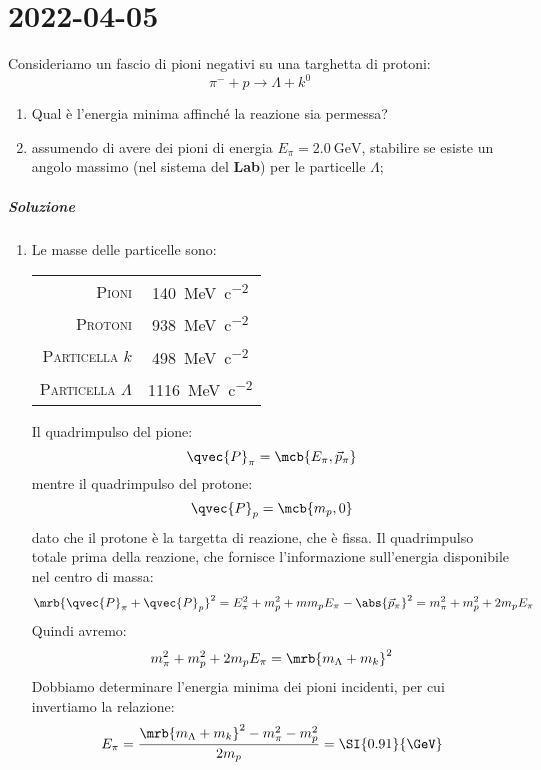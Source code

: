 \chapter{2022-04-05}
\begin{example}[]
  Consideriamo un fascio di pioni negativi su una targhetta di protoni:
  \[
    \pi ^{-} + p \rightarrow \Lambda + k^0
  \]
  \begin{enumerate}
    \item Qual è l'energia minima affinché la reazione sia permessa?
    \item assumendo di avere dei pioni di energia $E _{\pi} = \SI{2.0}{\GeV}$,
      stabilire se esiste un angolo massimo (nel sistema del \textbf{Lab}) per
      le particelle $\Lambda$;
  \end{enumerate}

  \paragraph{Soluzione}
  \begin{enumerate}
    \item Le masse delle particelle sono:
      \begin{table}[h!]
        \centering
        \begin{tabular}{r|c}
          \textsc{Pioni} & \SI{140}{\MeV \per c^2}
          \\
          \textsc{Protoni} & \SI{938}{\MeV \per c^2}
          \\
          \textsc{Particella $k$} & \SI{498}{\MeV \per c^2}
          \\
          \textsc{Particella $\Lambda$} & \SI{1116}{\MeV \per c^2}
        \end{tabular}
      \end{table}
      Il quadrimpulso del pione:
      \[
        \qvec{P} _{\pi} = \mcb{E _{\pi}, \vec{p}_{\pi}}
      \]
      mentre il quadrimpulso del protone:
      \[
        \qvec{P}_{p} = \mcb{m _{p}, 0}
      \]
      dato che il protone è la targetta di reazione, che è fissa.
      Il quadrimpulso totale prima della reazione, che fornisce l'informazione
      sull'energia disponibile nel centro di massa:
      \[
        \mrb{\qvec{P}_{\pi} + \qvec{P}_{p}}^{2} = E _{\pi}^{2} + m _{p}^{2} + m
        m_p E _{\pi} - \abs{\vec{p}_{\pi}}^{2} = m _{\pi}^{2} + m _{p}^{2} + 2
        m_p E _{\pi}
      \]
      Quindi avremo:
      \[
        m _{\pi}^{2} + m _{p}^{2} + 2 m_p E _{\pi} = \mrb{m _{\Lambda} + m
        _{k}}^{2}
      \]
      Dobbiamo determinare l'energia minima dei pioni incidenti, per cui
      invertiamo la relazione:
      \[
        E _{\pi} = \frac{\mrb{m _{\Lambda} + m _{k}}^{2} - m _{\pi}^{2} - m
        _{p}^{2}}{2 m_p} = \SI{0.91}{\GeV}
      \]


\end{enumerate}
\end{example}
